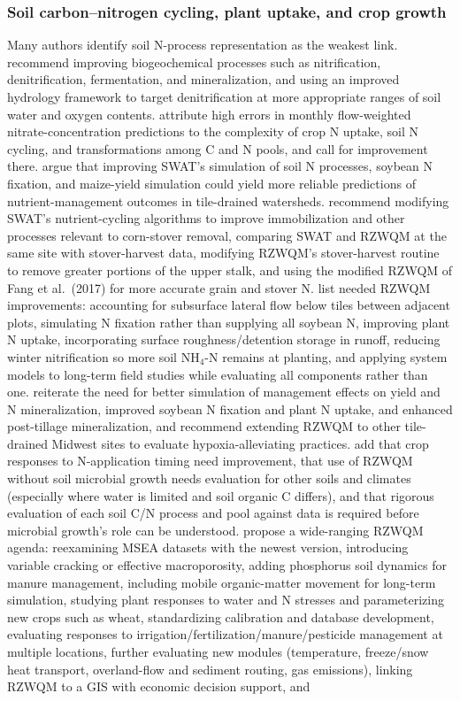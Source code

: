 \documentclass[11pt]{article}
\begin{document}
\subsubsection{Soil carbon--nitrogen cycling, plant uptake, and crop growth}
Many authors identify soil N-process representation as the weakest link. \textcite{Smith2020} recommend improving biogeochemical processes such as nitrification, denitrification, fermentation, and mineralization, and using an improved hydrology framework to target denitrification at more appropriate ranges of soil water and oxygen contents. \textcite{Fang2012} attribute high errors in monthly flow-weighted nitrate-concentration predictions to the complexity of crop N uptake, soil N cycling, and transformations among C and N pools, and call for improvement there. \textcite{Hu2007} argue that improving SWAT's simulation of soil N processes, soybean N fixation, and maize-yield simulation could yield more reliable predictions of nutrient-management outcomes in tile-drained watersheds. \textcite{Malone2019} recommend modifying SWAT's nutrient-cycling algorithms to improve immobilization and other processes relevant to corn-stover removal, comparing SWAT and RZWQM at the same site with stover-harvest data, modifying RZWQM's stover-harvest routine to remove greater portions of the upper stalk, and using the modified RZWQM of Fang et al.\ (2017) for more accurate grain and stover N. \textcite{Ma2007} list needed RZWQM improvements: accounting for subsurface lateral flow below tiles between adjacent plots, simulating N fixation rather than supplying all soybean N, improving plant N uptake, incorporating surface roughness/detention storage in runoff, reducing winter nitrification so more soil NH$_4$-N remains at planting, and applying system models to long-term field studies while evaluating all components rather than one. \textcite{Ma2007b} reiterate the need for better simulation of management effects on yield and N mineralization, improved soybean N fixation and plant N uptake, and enhanced post-tillage mineralization, and recommend extending RZWQM to other tile-drained Midwest sites to evaluate hypoxia-alleviating practices. \textcite{Ma2008} add that crop responses to N-application timing need improvement, that use of RZWQM without soil microbial growth needs evaluation for other soils and climates (especially where water is limited and soil organic C differs), and that rigorous evaluation of each soil C/N process and pool against data is required before microbial growth's role can be understood. \textcite{Ma2001} propose a wide-ranging RZWQM agenda: reexamining MSEA datasets with the newest version, introducing variable cracking or effective macroporosity, adding phosphorus soil dynamics for manure management, including mobile organic-matter movement for long-term simulation, studying plant responses to water and N stresses and parameterizing new crops such as wheat, standardizing calibration and database development, evaluating responses to irrigation/fertilization/manure/pesticide management at multiple locations, further evaluating new modules (temperature, freeze/snow heat transport, overland-flow and sediment routing, gas emissions), linking RZWQM to a GIS with economic decision support, and 
\end{document}
